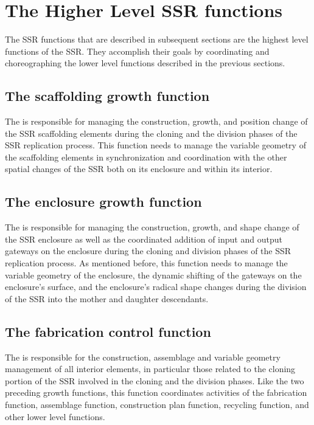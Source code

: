 \section{The Higher Level SSR functions}

The SSR functions that are
described in subsequent sections are the highest level functions of the
SSR. They accomplish their goals by coordinating and choreographing the
lower level functions described in the previous sections.

\subsection{The scaffolding growth function}

The  
is responsible for managing the construction, growth, and
position change of the SSR scaffolding elements during the cloning and
the division phases of the SSR replication process. This function needs to
manage the variable geometry of the scaffolding elements in
synchronization and coordination with the other spatial changes of the
SSR both on its enclosure and within its interior.

\subsection{The enclosure growth function}

The  is responsible for managing
the construction, growth, and shape
change of the SSR enclosure as well as the coordinated addition of
input and output gateways on the enclosure during the cloning and
division phases of the SSR replication process. As mentioned before, this
function needs to manage the variable geometry of the enclosure, the
dynamic shifting of the gateways on the enclosure's surface, and the
enclosure's radical shape changes during the division of the SSR
into the mother and daughter descendants.

\subsection{The fabrication control function}

The  is responsible for the construction, assemblage and variable
geometry management of all interior elements, in particular those
related to the cloning portion of the SSR involved in the cloning and the
division phases.  Like the two preceding growth
functions, this function coordinates activities of the fabrication
function, assemblage function, construction plan function, recycling
function, and other lower level functions. 

